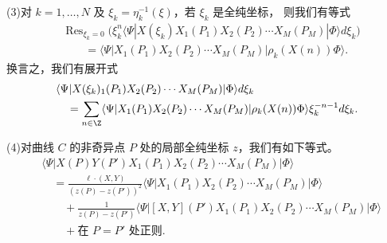 \begin{theorem}[3.24]
(3)\quad 对 $k=1,\dots,N$ 及 $\xi_k=\eta_k^{-1}(\xi)$，若 $\xi_k$ 是全纯坐标，
则我们有等式
\[
\begin{aligned}
&\operatorname{Res}_{\xi_k=0}\bigl(\xi_k^n\langle\Psi|X(\xi_k)X_1(P_1)X_2(P_2)
  \cdots X_M(P_M)|\Phi\rangle d\xi_k\bigr)\\
&\qquad= \langle\Psi|X_1(P_1)X_2(P_2)\cdots X_M(P_M)|\rho_k(X(n))\Phi\rangle .
\end{aligned}
\]
换言之，我们有展开式
\[
  \begin{aligned}
  &\langle\Psi|X(\xi_k)_1(P_1)X_2(P_2)\cdots X_M(P_M)|\Phi\rangle d\xi_k\\
  &\quad = \sum_{n\in\Z}\langle\Psi|X_1(P_1)X_2(P_2)\cdots X_M(P_M)
     |\rho_k(X(n))\Phi\rangle\xi_k^{-n-1}d\xi_k .
  \end{aligned}
\]

(4)\quad 对曲线 $C$ 的非奇异点 $P$ 处的局部全纯坐标 $z$，我们有如下等式。
\[
  \begin{aligned}
  &\langle\Psi|X(P)Y(P')X_1(P_1)X_2(P_2)\cdots X_M(P_M)|\Phi\rangle\\
  &\quad = \frac{\ell\cdot(X,Y)}{(z(P)-z(P'))^2}
      \langle\Psi|X_1(P_1)X_2(P_2)\cdots X_M(P_M)|\Phi\rangle\\
  &\quad\quad +\frac{1}{z(P)-z(P')}
      \langle\Psi|[X,Y](P')X_1(P_1)X_2(P_2)\cdots X_M(P_M)|\Phi\rangle\\
  &\quad\quad +\text{在 } P=P' \text{ 处正则}.
  \end{aligned}
\]


\end{theorem}
